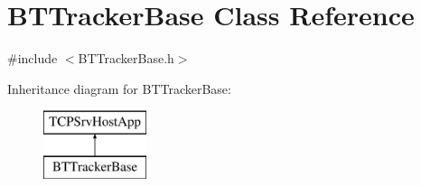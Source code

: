 \hypertarget{classBTTrackerBase}{}\section{B\+T\+Tracker\+Base Class Reference}
\label{classBTTrackerBase}


{\ttfamily \#include $<$B\+T\+Tracker\+Base.\+h$>$}

Inheritance diagram for B\+T\+Tracker\+Base\+:\begin{figure}[H]
\begin{center}
\leavevmode
\includegraphics[height=2.000000cm]{classBTTrackerBase}
\end{center}
\end{figure}
